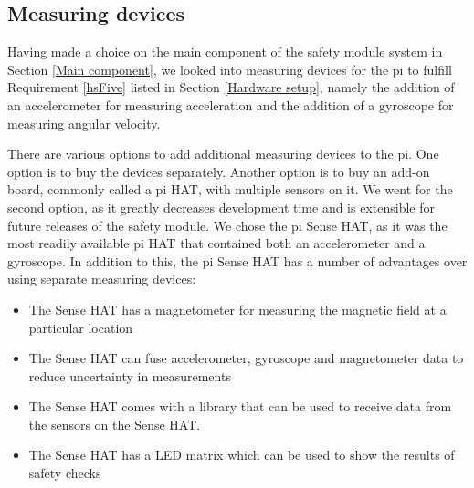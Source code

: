 \documentclass[12pt]{scrreprt}
\begin{document}
\subsection{Measuring devices}
Having made a choice on the main component of the safety module system in Section \ref{Main component}, we looked into measuring devices for the \gls{pi} to fulfill Requirement \ref{hsFive} listed in Section \ref{Hardware setup}, namely the addition of an accelerometer for measuring acceleration and the addition of a gyroscope for measuring angular velocity.
\par
There are various options to add additional measuring devices to the \gls{pi}. One option is to buy the devices separately. Another option is to buy an add-on board, commonly called a \gls{pi} HAT, with multiple sensors on it. We went for the second option, as it greatly decreases development time and is extensible for future releases of the safety module. We chose the \gls{pi} Sense HAT, as it was the most readily available \gls{pi} HAT that contained both an accelerometer and a gyroscope. In addition to this, the \gls{pi} Sense HAT has a number of advantages over using separate measuring devices:

\begin{itemize}
    \item The Sense HAT has a magnetometer for measuring the magnetic field at a particular location
    \item The Sense HAT can fuse accelerometer, gyroscope and magnetometer data to reduce uncertainty in measurements
    \item The Sense HAT comes with a library that can be used to receive data from the sensors on the Sense HAT.
    \item The Sense HAT has a LED matrix which can be used to show the results of safety checks
\end{itemize}
\end{document}
